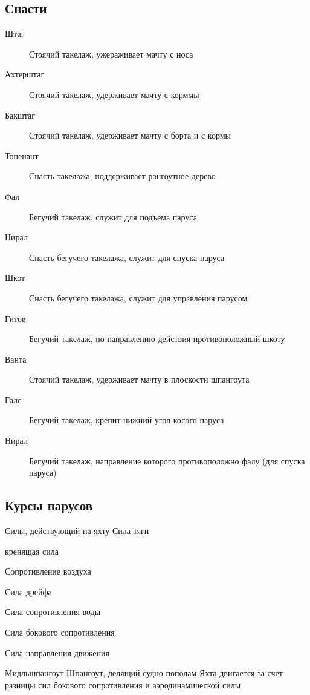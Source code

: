 \documentclass{article}        %
\begin{document}
\subsection{Снасти}
\begin{description}
	\item[Штаг] Стоячий такелаж, ужераживает мачту с носа
	\item[ Ахтерштаг ] Стоячий такелаж, удерживает мачту с корммы
	\item[ Бакштаг ] Стоячий такелаж, удерживает мачту с борта и с кормы
	\item[ Топенант ] Снасть такелажа, поддерживает рангоутное дерево

	\item [ Фал ] Бегучий такелаж, служит для подъема паруса

	\item [ Нирал ] Снасть бегучего такелажа, служит для спуска паруса 
	\item [ Шкот ] Снасть бегучего такелажа, служит для управления парусом

	\item [ Гитов ] Бегучий такелаж, по направлению действия противоположный шкоту

	\item [ Ванта ] Стоячий такелаж, удерживает мачту в плоскости шпангоута

	\item [ Галс ] Бегучий такелаж, крепит нижний угол косого паруса

	\item [ Нирал ] Бегучий такелаж, направление которого противоположно фалу (для спуска паруса)

\end{description}


\subsection{Курсы парусов}
Силы, действующий на яхту
Сила тяги

кренящая сила

Сопротивление воздуха

Сила дрейфа

Сила сопротивления воды

Сила бокового сопротивления

Сила направления движения


Мидльшпангоут
Шпангоут, делящий судно пополам
Яхта двигается за счет разницы сил бокового сопротивления и аэродинамической силы
\end{document}
